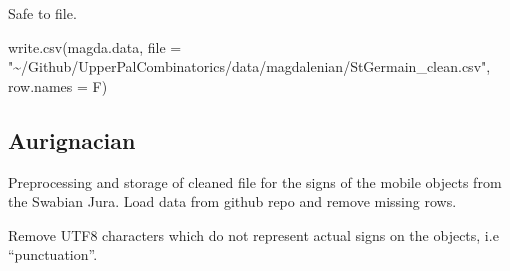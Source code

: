 \documentclass[
]{article}
\newenvironment{Shaded}{\begin{snugshade}}{\end{snugshade}}
\newcommand{\AttributeTok}[1]{\textcolor[rgb]{0.77,0.63,0.00}{#1}}
\newcommand{\CommentTok}[1]{\textcolor[rgb]{0.56,0.35,0.01}{\textit{#1}}}
\newcommand{\FunctionTok}[1]{\textcolor[rgb]{0.00,0.00,0.00}{#1}}
\newcommand{\NormalTok}[1]{#1}
\newcommand{\OtherTok}[1]{\textcolor[rgb]{0.56,0.35,0.01}{#1}}
\newcommand{\SpecialCharTok}[1]{\textcolor[rgb]{0.00,0.00,0.00}{#1}}
\newcommand{\StringTok}[1]{\textcolor[rgb]{0.31,0.60,0.02}{#1}}
\begin{document}
Safe to file.

\begin{Shaded}
\begin{Highlighting}[]
\FunctionTok{write.csv}\NormalTok{(magda.data, }
          \AttributeTok{file =} \StringTok{"\textasciitilde{}/Github/UpperPalCombinatorics/data/magdalenian/StGermain\_clean.csv"}\NormalTok{,}
          \AttributeTok{row.names =}\NormalTok{ F)}
\end{Highlighting}
\end{Shaded}

\hypertarget{aurignacian}{%
\subsection{Aurignacian}\label{aurignacian}}

Preprocessing and storage of cleaned file for the signs of the mobile
objects from the Swabian Jura. Load data from github repo and remove
missing rows.

\begin{Shaded}
\end{Shaded}

Remove UTF8 characters which do not represent actual signs on the
objects, i.e ``punctuation''.
\end{document}
